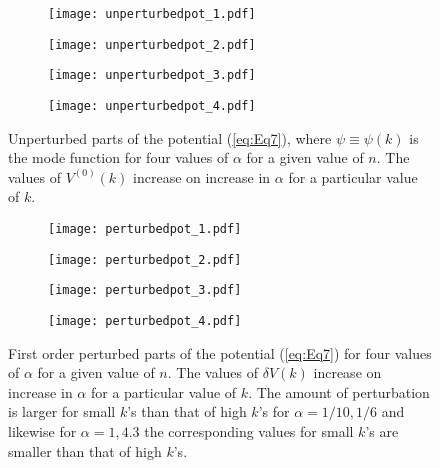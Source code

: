 \documentclass[a4paper,11pt]{article}
\begin{document}
 \begin{figure}[H]
\begin{subfigure}{0.52\linewidth}
  \centering
   \texttt{[image: unperturbedpot\_1.pdf]} 
   \subcaption{}
   \label{fig:unperturbedPOT_1}
\end{subfigure}%
\begin{subfigure}{0.52\linewidth}
  \centering
   \texttt{[image: unperturbedpot\_2.pdf]}
   \subcaption{}
   \label{fig:unperturbedPOT_2}
\end{subfigure}%
\vspace{0.1\linewidth}
\begin{subfigure}{0.52\linewidth}
  \centering
   \texttt{[image: unperturbedpot\_3.pdf]}
   \subcaption{}
    \label{fig:unperturbedPOT_3}
\end{subfigure}%
\begin{subfigure}{0.52\linewidth}
  \centering
   \texttt{[image: unperturbedpot\_4.pdf]}
   \subcaption{}
    \label{fig:unperturbedPOT_4}
\end{subfigure}
\caption{Unperturbed parts of the potential (\ref{eq:Eq7}), where $\psi\equiv \psi(k)$ is the mode function for four values of $\alpha$ for a given value of $n$. The values of $V^{(0)}(k)$ increase on increase in $\alpha$ for a particular value of $k$.}
\label{fig:unperturbedPOT}
\end{figure}
 \begin{figure}[H]
\begin{subfigure}{0.52\linewidth}
  \centering
   \texttt{[image: perturbedpot\_1.pdf]} 
   \subcaption{}
   \label{fig:perturbedPOT_1}
\end{subfigure}%
\begin{subfigure}{0.52\linewidth}
  \centering
   \texttt{[image: perturbedpot\_2.pdf]}
   \subcaption{}
   \label{fig:perturbedPOT_2}
\end{subfigure}%
\vspace{0.1\linewidth}
\begin{subfigure}{0.52\linewidth}
  \centering
   \texttt{[image: perturbedpot\_3.pdf]}
   \subcaption{}
    \label{fig:perturbedPOT_3}
\end{subfigure}%
\begin{subfigure}{0.52\linewidth}
  \centering
   \texttt{[image: perturbedpot\_4.pdf]}
   \subcaption{}
    \label{fig:perturbedPOT_4}
\end{subfigure}
\caption{First order perturbed parts of the potential (\ref{eq:Eq7}) for four values of $\alpha$ for a given value of $n$. The values of $\delta V(k)$ increase on increase in $\alpha$ for a particular value of $k$. The amount of perturbation is larger for small $k$'s than that of high $k$'s for $\alpha=1/10,1/6$ and likewise for $\alpha=1,4.3$ the corresponding values for small $k$'s are smaller than that of high $k$'s. }
\label{fig:perturbedPOT}
\end{figure}
\end{document}

